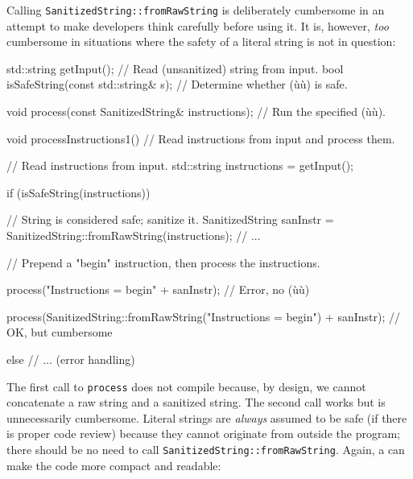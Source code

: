 \noindent Calling \lstinline!SanitizedString::fromRawString! is deliberately
cumbersome in an attempt to make developers think carefully before using
it. It is, however, \emph{too} cumbersome in situations where the safety
of a literal string is not in question:

\begin{emcppslisting}[emcppsbatch=e15]
std::string getInput();  // Read (unsanitized) string from input.
bool isSafeString(const std::string& s);  // Determine whether (ù{}ù) is safe.

void process(const SanitizedString& instructions);
    // Run the specified (ù{}ù).

void processInstructions1()
    // Read instructions from input and process them.
{
    // Read instructions from input.
    std::string instructions = getInput();

    if (isSafeString(instructions))
    {
       // String is considered safe; sanitize it.
       SanitizedString sanInstr = SanitizedString::fromRawString(instructions);
       // ...

       // Prepend a "begin" instruction, then process the instructions.

       process("Instructions = begin\n" + sanInstr);
           // Error, no (ù{}ù)

       process(SanitizedString::fromRawString("Instructions = begin\n") +
               sanInstr);
           // OK, but cumbersome
    }
    else
    {
        // ...                  (error handling)
    }
}
\end{emcppslisting}
    
\noindent The first call to \lstinline!process! does not compile because, by design,
we cannot concatenate a raw string and a sanitized string. The second
call works but is unnecessarily cumbersome. Literal strings are
\emph{always} assumed to be safe (if there is proper code review)
because they cannot originate from outside the program; there should be
no need to call \lstinline!SanitizedString::fromRawString!. Again, a
 can make the code more compact and readable:

